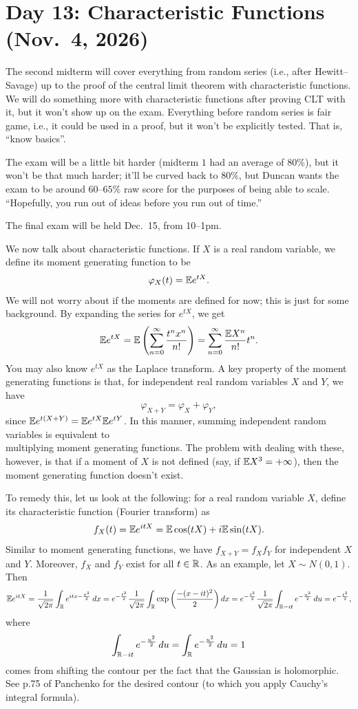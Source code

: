 \section{Day 13: Characteristic Functions (Nov.\ 4, 2026)}
The second midterm will cover everything from random series (i.e., after Hewitt--Savage) up to the proof of the central limit theorem with characteristic functions. We will do something more with characteristic functions after proving CLT with it, but it won't show up on the exam. Everything before random series is fair game, i.e., it could be used in a proof, but it won't be explicitly tested. That is, ``know basics''.

The exam will be a little bit harder (midterm $1$ had an average of $80\%$), but it won't be that much harder; it'll be curved back to $80\%$, but Duncan wants the exam to be around $60$--$65\%$ raw score for the purposes of being able to scale. ``Hopefully, you run out of ideas before you run out of time.''

The final exam will be held Dec.\ 15, from 10--1pm.

We now talk about characteristic functions. If $X$ is a real random variable, we define its moment generating function to be
\[ \varphi_X(t) = \mathbb E e^{tX}. \]
We will not worry about if the moments are defined for now; this is just for some background. By expanding the series for $e^{tX}$, we get
\[ \mathbb E e^{tX} = \mathbb E \left(\sum_{n=0}^\infty \frac{t^n x^n}{n!}\right) = \sum_{n=0}^\infty \frac{\mathbb E X^n}{n!} t^n. \]
You may also know $e^{tX}$ as the Laplace transform. A key property of the moment generating functions is that, for independent real random variables $X$ and $Y$, we have
\[ \varphi_{X + Y} = \varphi_X + \varphi_Y, \]
since $\mathbb E e^{t(X + Y)} = \mathbb E e^{tX} \mathbb E e^{tY}$. In this manner, summing independent random variables is equivalent to \\ multiplying moment generating functions. The problem with dealing with these, however, is that if a moment of $X$ is not defined (say, if $\mathbb E X^3 = +\infty$), then the moment generating function doesn't exist.

To remedy this, let us look at the following: for a real random variable $X$, define its characteristic function (Fourier transform) as
\[ f_X(t) = \mathbb E e^{itX} = \mathbb E \cos(tX) + i \mathbb E \sin(tX). \]
Similar to moment generating functions, we have $f_{X+Y} = f_X f_Y$ for independent $X$ and $Y$. Moreover, $f_X$ and $f_Y$ exist for all $t \in \mathbb R$. As an example, let $X \sim N(0, 1)$. Then
\[ \mathbb E e^{it X} = \frac{1}{\sqrt{2\pi}} \int_\mathbb R e^{itx - \frac{x^2}{2}} \, dx = e^{-\frac{t^2}{2}} \frac{1}{\sqrt{2\pi}} \int_\mathbb R \exp\left(\frac{-(x - it)^2}{2}\right) dx = e^{-\frac{t^2}{2}} \frac{1}{\sqrt{2\pi}} \int_{\mathbb R - it} e^{-\frac{u^2}{2}} \, du = e^{-\frac{t^2}{2}}, \]
where
\[ \int_{\mathbb R - it} e^{-\frac{u^2}{2}} \, du = \int_\mathbb R e^{-\frac{u^2}{2}} \, du = 1 \]
comes from shifting the contour per the fact that the Gaussian is holomorphic. See p.75 of Panchenko for the desired contour (to which you apply Cauchy's integral formula).

